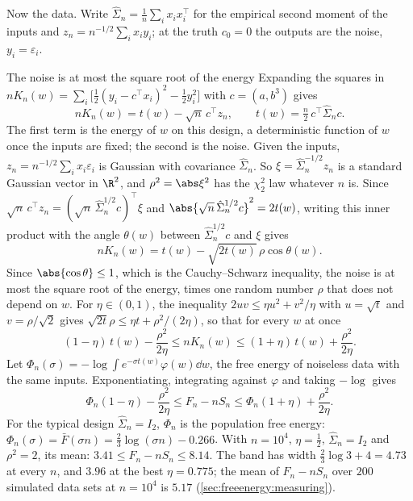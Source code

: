 \begin{refsection}
Now the data. Write $\hat\Sigma_n=\frac1n\sum_ix_ix_i^\top$ for the empirical second moment of the inputs and $z_n=n^{-1/2}\sum_ix_iy_i$; at the truth $c_0=0$ the outputs are the noise, $y_i=\varepsilon_i$.

\begin{computation}{The noise is at most the square root of the energy}\label{comp:freeenergy:sandwich}
\step Expanding the squares in $nK_n(w)=\sum_i\bigl[\tfrac12(y_i-c^\top x_i)^2-\tfrac12y_i^2\bigr]$ with $c=(a,b^3)$ gives
\[
nK_n(w)=t(w)-\sqrt n\,c^\top z_n,\qquad t(w)=\tfrac n2\,c^\top\hat\Sigma_nc .
\]
The first term is the energy of $w$ on this design, a deterministic function of $w$ once the inputs are fixed; the second is the noise.
\step Given the inputs, $z_n=n^{-1/2}\sum_ix_i\varepsilon_i$ is Gaussian with covariance $\hat\Sigma_n$. So $\xi=\hat\Sigma_n^{-1/2}z_n$ is a standard Gaussian vector in $\R^2$, and $\rho^2=\abs\xi^2$ has the $\chi^2_2$ law whatever $n$ is.
\step Since $\sqrt n\,c^\top z_n=(\sqrt n\,\hat\Sigma_n^{1/2}c)^\top\xi$ and $\abs{\sqrt n\,\hat\Sigma_n^{1/2}c}^2=2t(w)$, writing this inner product with the angle $\theta(w)$ between $\hat\Sigma_n^{1/2}c$ and $\xi$ gives
\[
nK_n(w)=t(w)-\sqrt{2t(w)}\,\rho\cos\theta(w).
\]
Since $\abs{\cos\theta}\le1$, which is the Cauchy--Schwarz inequality, the noise is at most the square root of the energy, times one random number $\rho$ that does not depend on $w$.
\step For $\eta\in(0,1)$, the inequality $2uv\le\eta u^2+v^2/\eta$ with $u=\sqrt t$ and $v=\rho/\sqrt2$ gives $\sqrt{2t}\rho\le\eta t+\rho^2/(2\eta)$, so that for every $w$ at once
\[
(1-\eta)\,t(w)-\frac{\rho^2}{2\eta}\le nK_n(w)\le(1+\eta)\,t(w)+\frac{\rho^2}{2\eta}.
\]
\step Let $\Phi_n(\sigma)=-\log\int e^{-\sigma t(w)}\varphi(w)\dd w$, the free energy of noiseless data with the same inputs. Exponentiating, integrating against $\varphi$ and taking $-\log$ gives
\[
\Phi_n(1-\eta)-\frac{\rho^2}{2\eta}\le F_n-nS_n\le\Phi_n(1+\eta)+\frac{\rho^2}{2\eta}.
\]
For the typical design $\hat\Sigma_n=I_2$, $\Phi_n$ is the population free energy: $\Phi_n(\sigma)=\bar F(\sigma n)=\tfrac23\log(\sigma n)-0.266$.
\step With $n=10^4$, $\eta=\tfrac12$, $\hat\Sigma_n=I_2$ and $\rho^2=2$, its mean: $3.41\le F_n-nS_n\le8.14$. The band has width $\tfrac23\log3+4=4.73$ at every $n$, and $3.96$ at the best $\eta=0.775$; the mean of $F_n-nS_n$ over $200$ simulated data sets at $n=10^4$ is $5.17$ (\cref{sec:freeenergy:measuring}).
\end{computation}


\end{refsection}
